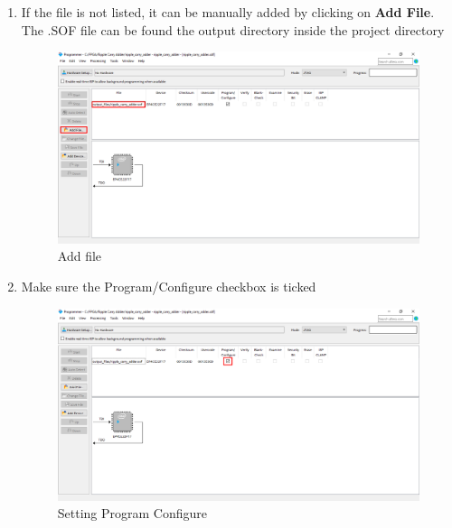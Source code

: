 \documentclass[12pt,singleside,a4paper]{article}
\begin{document}
\begin{enumerate}
     \item If the file is not listed, it can be manually added by clicking on \textbf{Add File}. The .SOF file can be found the output directory inside the project directory 
     \begin{figure}[H]
         \centering
         \includegraphics[width=14cm,keepaspectratio]{img19.png}
     \caption{Add file}
     \end{figure}
     \newpage
     \item Make sure the Program/Configure checkbox is ticked
     \begin{figure}[H]
         \centering
         \includegraphics[width=14cm,keepaspectratio]{img20.png}
     \caption{Setting Program Configure}
     \end{figure}
     

\end{enumerate}
\end{document}
